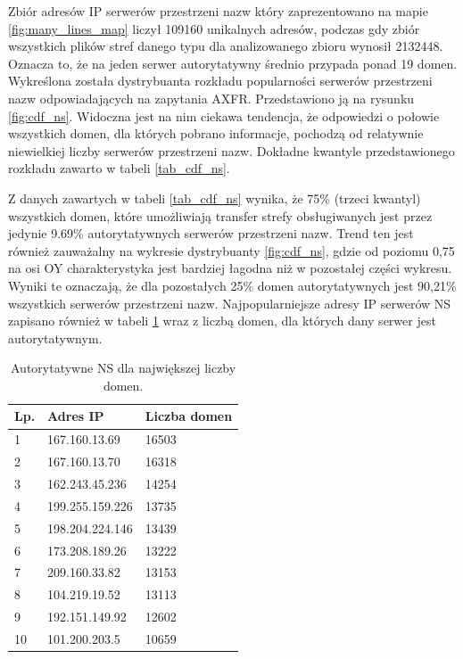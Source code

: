 Zbiór adresów IP serwerów przestrzeni nazw który zaprezentowano na mapie \ref{fig:many_lines_map} liczył 109160 unikalnych adresów, podczas
gdy zbiór wszystkich plików stref danego typu dla analizowanego zbioru wynosił 2132448. Oznacza to, że na jeden serwer autorytatywny
średnio przypada ponad 19 domen. Wykreślona została dystrybuanta rozkładu popularności serwerów przestrzeni nazw odpowiadających na
zapytania AXFR. Przedstawiono ją na rysunku \ref{fig:cdf_ns}. Widoczna jest na nim ciekawa tendencja, że odpowiedzi o połowie
wszystkich domen, dla których pobrano informacje, pochodzą od relatywnie niewielkiej liczby serwerów przestrzeni nazw. Dokładne
kwantyle przedstawionego rozkładu zawarto w tabeli \ref{tab_cdf_ns}.

Z danych zawartych w tabeli \ref{tab_cdf_ns} wynika, że 75\% (trzeci kwantyl) wszystkich domen, które umożliwiają transfer strefy
obsługiwanych jest przez jedynie 9.69\% autorytatywnych serwerów przestrzeni nazw. Trend ten jest również zauważalny na wykresie
dystrybuanty \ref{fig:cdf_ns}, gdzie od poziomu 0,75 na osi OY charakterystyka jest bardziej łagodna niż w pozostałej części wykresu.
Wyniki te oznaczają, że dla pozostałych 25\% domen autorytatywnych jest 90,21\% wszystkich serwerów przestrzeni nazw. Najpopularniejsze
adresy IP serwerów NS zapisano również w tabeli \ref{tab:most_cnt_ns} wraz z liczbą domen, dla których dany serwer jest autorytatywnym.

\begin{table}[h]
	\centering
	\begin{tabular}{|p{}|p{}|p{}|}
	\hline
	\textbf{Lp.} &
	\textbf{Adres IP} &
	\textbf{Liczba domen} \\
	\hline\hline
	1 & 167.160.13.69 & 16503 \\
	2 & 167.160.13.70 & 16318 \\
	3 & 162.243.45.236 & 14254 \\
	4 & 199.255.159.226 & 13735 \\
	5 & 198.204.224.146 & 13439 \\
	6 & 173.208.189.26 & 13222 \\
	7 & 209.160.33.82 & 13153 \\
	8 & 104.219.19.52 & 13113 \\
	9 & 192.151.149.92 & 12602 \\
	10 & 101.200.203.5 & 10659 \\
	\hline
	\end{tabular}
	\caption{Autorytatywne NS dla największej liczby domen.}
	\label{tab:most_cnt_ns}
\end{table}

